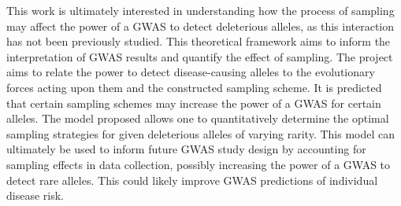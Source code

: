 This work is ultimately interested in understanding how the process of sampling may affect the power of a GWAS to detect deleterious alleles, as this interaction has not been previously studied. This theoretical framework aims to inform the interpretation of GWAS results and quantify the effect of sampling. The project aims to relate the power to detect disease-causing alleles to the evolutionary forces acting upon them and the constructed sampling scheme. It is predicted that certain sampling schemes may increase the power of a GWAS for certain alleles. The model proposed allows one to quantitatively determine the optimal sampling strategies for given deleterious alleles of varying rarity. This model can ultimately be used to inform future GWAS study design by accounting for sampling effects in data collection, possibly increasing the power of a GWAS to detect rare alleles. This could likely improve GWAS predictions of individual disease risk.


